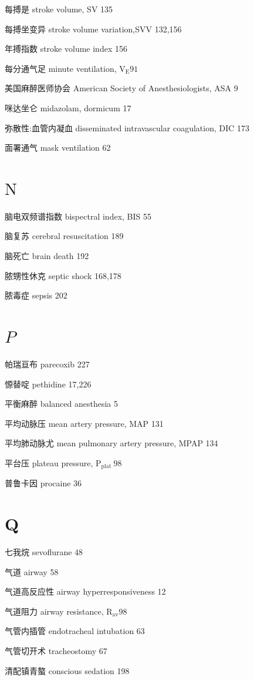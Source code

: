 \documentclass[10pt]{article}
\begin{document}
每搏是 stroke volume, SV 135

每搏坐变异 stroke volume variation,SVV 132,156

年搏指数 stroke volume index 156

每分通气足 minute ventilation, $\mathrm{V}_{\mathrm{E}} 91$

美国麻醉医师协会 American Society of Anesthesiologists, ASA 9

咪达坐仑 midazolam, dormicum 17

弥散性:血管内凝血 disseminated intravascular coagulation, DIC 173

面署通气 mask ventilation 62

\section*{$\mathrm{N}$}
脑电双频谱指数 bispectral index, BIS 55

脑复苏 cerebral resuscitation 189

脑死亡 brain death 192

脓甥性休克 septic shock 168,178

脓毒症 sepsis 202

\section*{$P$}
帕瑞亘布 parecoxib 227

㥳替啶 pethidine 17,226

平衡麻醉 balanced anesthesia 5

平均动脉压 mean artery pressure, MAP 131

平均肺动脉尤 mean pulmonary artery pressure, MPAP 134

平台压 plateau pressure, $\mathrm{P}_{\text {plat }} 98$

普鲁卡因 procaine 36

\section*{Q}
七我烷 sevoflurane 48

气道 airway 58

气道高反应性 airway hyperresponsiveness 12

气道阻力 airway resistance, $\mathrm{R}_{\mathrm{av}} 98$

气管内插管 endotracheal intubation 63

气管切开术 tracheostomy 67

清配镇青螯 conscious sedation 198
\end{document}
